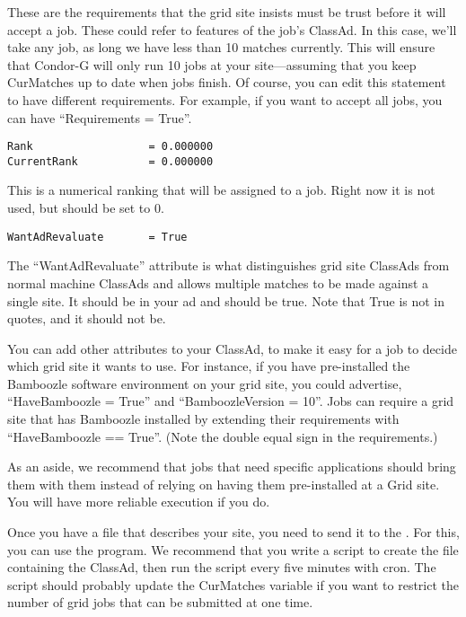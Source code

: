 These are the requirements that the grid site insists must be trust
before it will accept a job. These could refer to features of the
job's ClassAd. In this case, we'll take any job, as long we have less
than 10 matches currently. This will ensure that Condor-G will only
run 10 jobs at your site---assuming that you keep CurMatches up to
date when jobs finish. Of course, you can edit this statement to have
different requirements. For example, if you want to accept all jobs,
you can have ``Requirements = True''. 

\footnotesize
\begin{verbatim}
Rank                  = 0.000000
CurrentRank           = 0.000000
\end{verbatim}
\normalsize

This is a numerical ranking that will be assigned to a job. Right now
it is not used, but should be set to 0. 

\begin{verbatim}
WantAdRevaluate       = True
\end{verbatim}

The ``WantAdRevaluate'' attribute is what distinguishes grid site
ClassAds from normal machine ClassAds and allows multiple matches to
be made against a single site. It should be in your ad and should be
true. Note that True is not in quotes, and it should not be.

You can add other attributes to your ClassAd, to make it easy for a
job to decide which grid site it wants to use. For instance, if you
have pre-installed the Bamboozle software environment on your grid
site, you could advertise, ``HaveBamboozle = True'' and
``BamboozleVersion = 10''. Jobs can require a grid site that has
Bamboozle installed by extending their requirements with
``HaveBamboozle == True''. (Note the double equal sign in the
requirements.) 

As an aside, we recommend that jobs that need specific applications
should bring them with them instead of relying on having them
pre-installed at a Grid site. You will have more reliable execution if
you do. 

Once you have a file that describes your site, you need to send it to
the . For this, you can use the 
program. We recommend that you write a script to create the file
containing the ClassAd, then run the script every five minutes with
cron. The script should probably update the CurMatches variable if you
want to restrict the number of grid jobs that can be submitted at one
time. 

